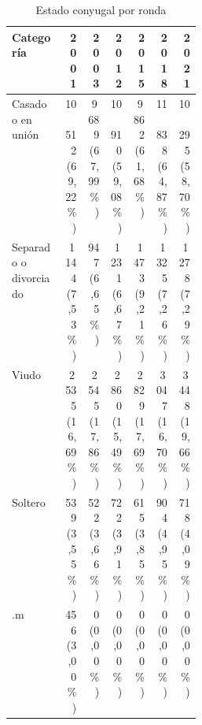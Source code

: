 \begin{table}[!htbp]
\centering
\caption{Estado conyugal por ronda}\label{tab:cp1-est-conyugal}
\small\setlength{\tabcolsep}{4pt}
\renewcommand{\arraystretch}{1.15}
\begin{tabular}{p{0.28\linewidth}rrrrrr}
\toprule
\textbf{Categoría} & \textbf{2001} & \textbf{2003} & \textbf{2012} & \textbf{2015} & \textbf{2018} & \textbf{2021} \\
\midrule
Casado o en unión & \shortstack[r]{10\,512\\(69,22\%)} & \shortstack[r]{9\,689\\(67,99\%)} & \shortstack[r]{10\,910\\(59,08\%)} & \shortstack[r]{9\,862\\(61,68\%)} & \shortstack[r]{11\,838\\(64,87\%)} & \shortstack[r]{10\,295\\(58,70\%)} \\
Separado o divorciado & \shortstack[r]{1\,144\\(7,53\%)} & \shortstack[r]{947\\(6,65\%)} & \shortstack[r]{1\,231\\(6,67\%)} & \shortstack[r]{1\,473\\(9,21\%)} & \shortstack[r]{1\,325\\(7,26\%)} & \shortstack[r]{1\,278\\(7,29\%)} \\
Viudo & \shortstack[r]{2\,535\\(16,69\%)} & \shortstack[r]{2\,545\\(17,86\%)} & \shortstack[r]{2\,860\\(15,49\%)} & \shortstack[r]{2\,829\\(17,69\%)} & \shortstack[r]{3\,047\\(16,70\%)} & \shortstack[r]{3\,448\\(19,66\%)} \\
Soltero & \shortstack[r]{539\\(3,55\%)} & \shortstack[r]{522\\(3,66\%)} & \shortstack[r]{722\\(3,91\%)} & \shortstack[r]{615\\(3,85\%)} & \shortstack[r]{904\\(4,95\%)} & \shortstack[r]{718\\(4,09\%)} \\
.m & \shortstack[r]{456\\(3,00\%)} & \shortstack[r]{0\\(0,00\%)} & \shortstack[r]{0\\(0,00\%)} & \shortstack[r]{0\\(0,00\%)} & \shortstack[r]{0\\(0,00\%)} & \shortstack[r]{0\\(0,00\%)} \\

\end{tabular}
\end{table}

